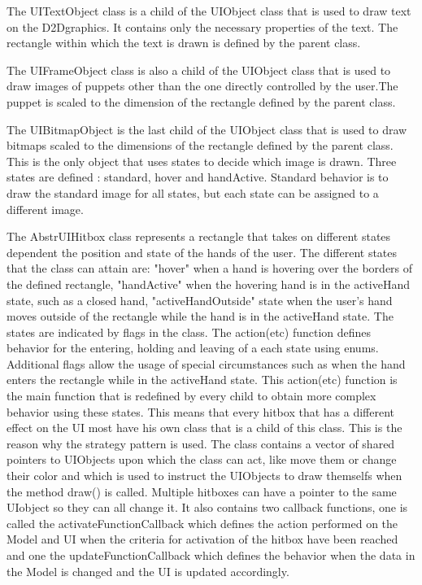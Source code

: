 The UI\textunderscore TextObject class is a child of the UI\textunderscore Object class that is used to draw text on the D2D\textunderscore graphics. It contains only the necessary properties of the text. The rectangle within which the text is drawn is defined by the parent class.

The UI\textunderscore FrameObject class is also a child of the UI\textunderscore Object class that is used to draw images of puppets other than the one directly controlled by the user.The puppet is scaled to the dimension of the rectangle defined by the parent class.

The UI\textunderscore BitmapObject is the last child of the UI\textunderscore Object class that is used to draw bitmaps scaled to the dimensions of the rectangle defined by the parent class. This is the only object that uses states to decide which image is drawn. Three states are defined : standard, hover and handActive. Standard behavior is to draw the standard image for all states, but each state can be assigned to a different image.

The Abstr\textunderscore UI\textunderscore Hitbox class represents a rectangle that takes on different states dependent the position and state of the hands of the user. The different states that the class can attain are: "hover" when a hand is hovering over the borders of the defined rectangle, "handActive" when the hovering hand is in the activeHand state, such as a closed hand, "activeHandOutside" state when the user's hand moves outside of the rectangle while the hand is in the activeHand state. The states are indicated by flags in the class. The action(etc) function defines behavior for the entering, holding and leaving of a each state using enums. Additional flags allow the usage of special circumstances such as when the hand enters the rectangle while in the activeHand state. This action(etc) function is the main function that is redefined by every child to obtain more complex behavior using these states. This means that every hitbox that has a different effect on the UI most have his own class that is a child of this class. This is the reason why the strategy pattern is used. The class contains a vector of shared pointers to UI\textunderscore Objects upon which the class can act, like move them or change their color and which is used to instruct the UI\textunderscore Objects to draw themselfs when the method draw() is called. Multiple hitboxes can have a pointer to the same UI\textunderscore object so they can all change it. It also contains two callback functions, one is called the activateFunctionCallback which defines the action performed on the Model and UI when the criteria for activation of the hitbox have been reached and one the updateFunctionCallback which defines the behavior when the data in the Model is changed and the UI is updated accordingly.

